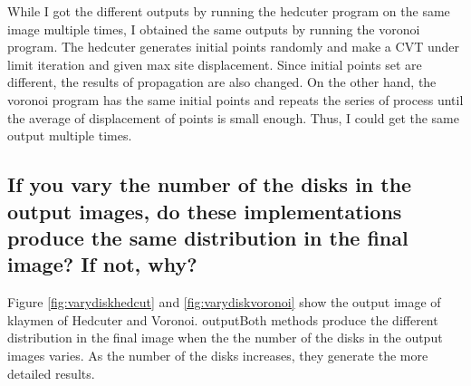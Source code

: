 \documentclass[11pt]{article}
\begin{document}
While I got the different outputs by running the hedcuter program on the same image multiple times, I obtained the same outputs by running the voronoi program. The hedcuter generates initial points randomly and make a CVT under limit iteration and given max site displacement. Since initial points set are different, the results of propagation are also changed. On the other hand, the voronoi program has the same initial points and repeats the series of process until the average of displacement of points is small enough. Thus, I could get the same output multiple times.

\subsection{If you vary the number of the disks in the output images, do these implementations produce the same distribution in the final image? If not, why?}%
Figure \ref{fig:varydiskhedcut} and \ref{fig:varydiskvoronoi} show the output image of klaymen of Hedcuter and Voronoi. outputBoth methods produce the different distribution in the final image when the the number of the disks in the output images varies. As the number of the disks increases, they generate the more detailed results.
\end{document}
